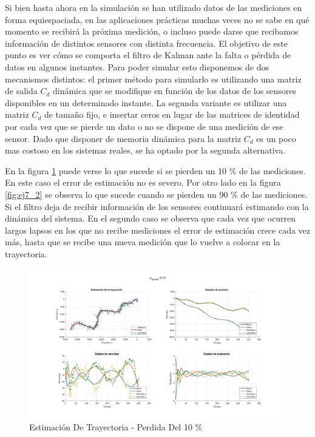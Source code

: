 
	Si bien hasta ahora en la simulación se han utilizado datos de las mediciones en forma equiespaciada, en las aplicaciones prácticas muchas veces no se sabe en qué momento se recibirá la próxima medición, o incluso puede darse que recibamos información de distintos sensores con distinta frecuencia. El objetivo de este punto es ver cómo se comporta el filtro de Kalman ante la falta o pérdida de datos en algunos instantes. Para poder simular esto disponemos de dos mecanismos distintos: el primer método para simularlo es utilizando una matriz de salida $C_d$ dinámica que se modifique en función de los datos de los sensores disponibles en un determinado instante. La segunda variante es utilizar una matriz $C_d$ de tamaño fijo, e insertar ceros en lugar de las matrices de identidad por cada vez que se pierde un dato o no se dispone de una medición de ese sensor. Dado que disponer de memoria dinámica para la matriz $C_d$ es un poco mas costoso en los sistemas reales, se ha optado por la segunda alternativa.
	
	En la figura \ref{fig:ej7_1} puede verse lo que sucede si se pierden un 10 \% de las mediciones. En este caso el error de estimación no es severo. Por otro lado en la figura \ref{fig:ej7_2} se observa lo que sucede cuando se pierden un 90 \% de las mediciones. Si el filtro deja de recibir información de los sensores continuará estimando con la dinámica del sistema. En el segundo caso se observa que cada vez que ocurren largos lapsos en los que no recibe mediciones el error de estimación crece cada vez más, hasta que se recibe una nueva medición que lo vuelve a colocar en la trayectoria.
	
	\begin{figure}[H]
		\centering
		\includegraphics[scale=0.5,trim={6,5cm 0 0 0}]{Figuras/graf_ej7_1.pdf}
		\caption{Estimación De Trayectoria - Perdida Del 10 \%}
		\label{fig:ej7_1}
	\end{figure}
	
